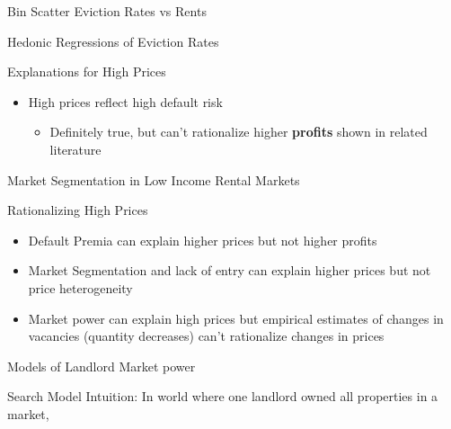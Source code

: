 \documentclass[10pt, xcolor=dvipsnames]{beamer}
\begin{document}
\begin{frame}{Bin Scatter Eviction Rates vs Rents}
    
\end{frame}

\begin{frame}{Hedonic Regressions of Eviction Rates}
    \begin{center}
        
    \end{center}
\end{frame}

\begin{frame}{Explanations for High Prices}
    \begin{itemize}
        \item High prices reflect high default risk
        \begin{itemize}
            \item Definitely true, but can't rationalize higher \textbf{profits} shown in related literature
        \end{itemize}
    \end{itemize}
    
\end{frame}

\begin{frame}{Market Segmentation in Low Income Rental Markets}
    
\end{frame}

    


\begin{frame}{Rationalizing High Prices}
    \begin{itemize}
        \item Default Premia can explain higher prices but not higher profits
        \item Market Segmentation and lack of entry can explain higher prices but not price heterogeneity
        \item Market power can explain high prices but empirical estimates of changes in vacancies (quantity decreases) can't rationalize changes in prices
    \end{itemize}

\end{frame}

\begin{frame}{Models of Landlord Market power}

    
\end{frame}

\begin{frame}{Search Model}
    Intuition: In world where one landlord owned all properties in a market, 
\end{frame}
\end{document}
